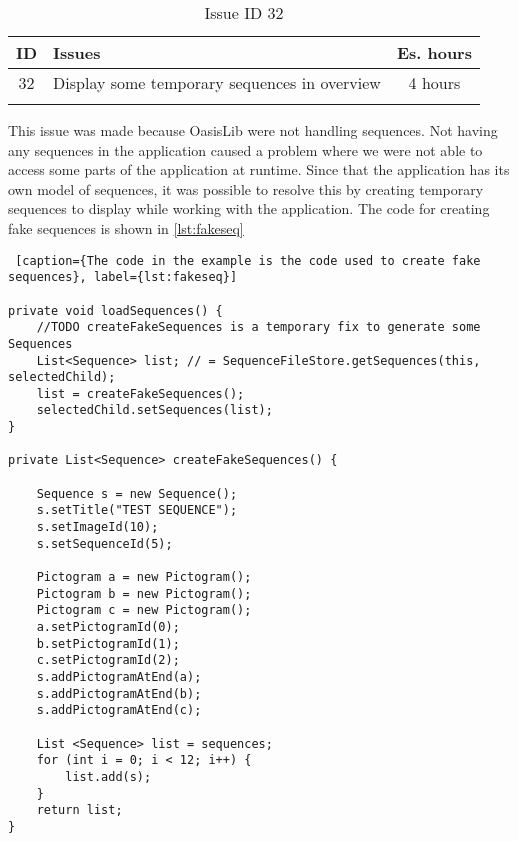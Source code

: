 \begin{longtable} { | c | p{12cm} | c | } 
\hline
	ID 	&	Issues	&		 Es. hours \\\hline
	32 	&	Display some temporary sequences in overview	&	4 hours \\\hline
\caption{Issue ID 32}
\label{tab:spr2_fakesequences}
\end{longtable}

This issue was made because OasisLib were not handling sequences. Not having any sequences in the application caused a problem where we were not able to access some parts of the application at runtime. Since that the application has its own model of sequences, it was possible to resolve this by creating temporary sequences to display while working with the application. The code for creating fake sequences is shown in \ref{lst:fakeseq}

\begin{lstlisting} [caption={The code in the example is the code used to create fake sequences}, label={lst:fakeseq}]

private void loadSequences() {
    //TODO createFakeSequences is a temporary fix to generate some Sequences
    List<Sequence> list; // = SequenceFileStore.getSequences(this, selectedChild);
    list = createFakeSequences();
    selectedChild.setSequences(list);
}

private List<Sequence> createFakeSequences() {

    Sequence s = new Sequence();
    s.setTitle("TEST SEQUENCE");
    s.setImageId(10);
    s.setSequenceId(5);

    Pictogram a = new Pictogram();
    Pictogram b = new Pictogram();
    Pictogram c = new Pictogram();
    a.setPictogramId(0);
    b.setPictogramId(1);
    c.setPictogramId(2);
    s.addPictogramAtEnd(a);
    s.addPictogramAtEnd(b);
    s.addPictogramAtEnd(c);

    List <Sequence> list = sequences;
    for (int i = 0; i < 12; i++) {
        list.add(s);
    }
    return list;
}

\end{lstlisting}